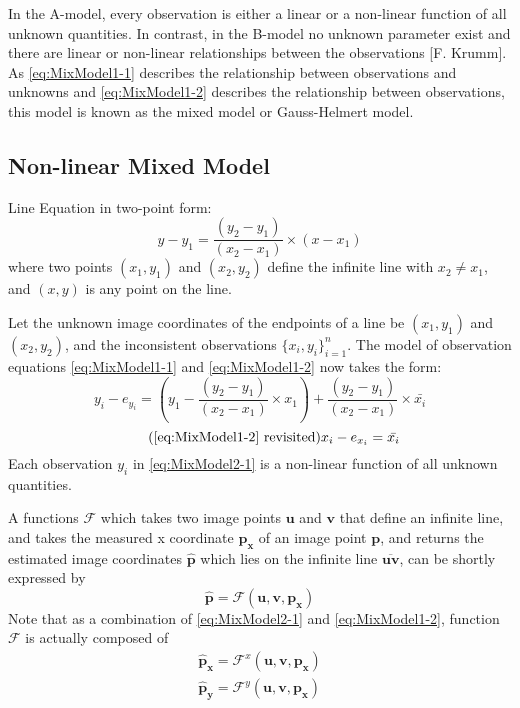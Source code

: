 In the A-model, every observation is either a linear or a non-linear function of all unknown quantities. In contrast, in the B-model no unknown parameter exist and there are linear or non-linear relationships between the observations [F. Krumm]. As \eqref{eq:MixModel1-1} describes the relationship between observations and unknowns and \eqref{eq:MixModel1-2} describes the relationship between observations, this model is known as the mixed model or Gauss-Helmert model.


\subsection{Non-linear Mixed Model}
\label{subsec:NonLinear}

Line Equation in two-point form:
\begin{equation} \label{eq:LineInTwoPointForm}
y-y_1 = \dfrac{(y_2-y_1)}{(x_2-x_1)}\times(x-x_1)
\end{equation}
where two points $(x_1,y_1)$ and $(x_2,y_2)$ define the infinite line with $x_2\neq x_1$, and $(x,y)$ is any point on the line.

Let the unknown image coordinates of the endpoints of a line be $(x_1,y_1)$ and $(x_2,y_2)$, and the inconsistent observations $\{x_i,y_i\}^n_{i=1}$. The model of observation equations \eqref{eq:MixModel1-1} and \eqref{eq:MixModel1-2} now takes the form: 
\begin{equation} \label{eq:MixModel2-1}
y_i - e_{y_i}= (y_1-\dfrac{(y_2-y_1)}{(x_2-x_1)}\times x_1) + \dfrac{(y_2-y_1)}{(x_2-x_1)}\times \bar{x_i}
\end{equation}
\begin{equation} \tag{\ref{eq:MixModel1-2} revisited}
x_i-e_{x_i} = \bar{x_i}
\end{equation}
Each observation $y_i$ in \eqref{eq:MixModel2-1} is a non-linear function of all unknown quantities.

A functions $\mathcal{F}$ which takes two image points $\mathbf{u}$ and $\mathbf{v}$ that define an infinite line, and takes the measured x coordinate $\mathbf{p_x}$ of an image point $\mathbf{p}$, and returns the estimated image coordinates $\mathbf{\hat{p}}$ which lies on the infinite line $\overline{\mathbf{u}\mathbf{v}}$, can be shortly expressed by
\begin{equation} \label{eq:Ffunction}
\mathbf{\hat{p}} = \mathcal{F}(\mathbf{u},\mathbf{v},\mathbf{p_x})
\end{equation}
Note that as a combination of \eqref{eq:MixModel2-1} and \eqref{eq:MixModel1-2}, function $\mathcal{F}$ is actually composed of
\begin{equation} \label{eq:Ffunction_xy}
\begin{split}
\mathbf{\hat{p}_x} = \mathcal{F}^x(\mathbf{u},\mathbf{v},\mathbf{p_x})\\
\mathbf{\hat{p}_y} = \mathcal{F}^y(\mathbf{u},\mathbf{v},\mathbf{p_x})
\end{split}
\end{equation}

